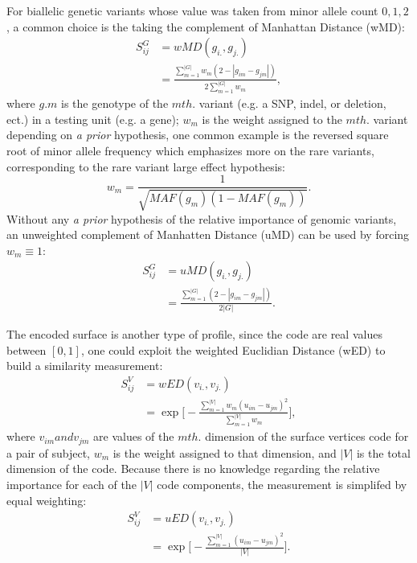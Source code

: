 \documentclass[twocolumn]{article}
\begin{document}
For biallelic genetic variants whose value was taken from minor allele count ${0, 1, 2}$, a common choice is the taking the complement of Manhattan Distance (wMD):
\begin{equation} \label{eq_wSG}
\begin{split}
  S_{ij}^G &= wMD(g_{i.},g_{j.}) \\
  &= \frac{\sum_{m=1}^{|G|}{w_m(2-|g_{im}-g_{jm}|)}} {2\sum_{m=1}^{|G|}{w_m}},
\end{split}
\end{equation}
where $g.m$ is the genotype of the $m th.$ variant (e.g. a SNP, indel, or deletion, ect.) in a testing unit (e.g. a gene); $w_m$ is the weight assigned to the $m th.$ variant depending on \textit{a prior} hypothesis, one common example is the reversed square root of minor allele frequency which emphasizes more on the rare variants, corresponding to the rare variant large effect hypothesis:
\begin{displaymath}w_m=\frac{1}{\sqrt{MAF(g_m)(1-MAF(g_m))}}.\end{displaymath}
Without any \textit{a prior} hypothesis of the relative importance of genomic variants, an unweighted complement of Manhatten Distance (uMD) can be used by forcing $w_m \equiv 1$:
\begin{equation*} \label{eq_uSG}
\begin{split}
  S_{ij}^G &= uMD(g_{i.}, g_{j.}) \\
  &= \frac{\sum_{m = 1}^{|G|}{(2-|g_{im} - g_{jm}|)}}  {2|G|}.
\end{split}
\end{equation*}

The encoded surface is another type of profile, since the code are real values between $[0,1]$, one could exploit the weighted Euclidian Distance (wED) to build a similarity measurement:
\begin{equation} \label{eq_wSV}
\begin{split}
  S_{ij}^V &= wED(v_{i.},v_{j.}) \\
  &= \exp
  {
    \Big[-\frac{\sum_{m=1}^{|V|}{w_m(u_{im}-u_{jm})^2}} {\sum_{m=1}^{|V|}{w_m}}\Big]
  },
\end{split}
\end{equation}
where $v_{im} and v_{jm}$ are values of the $m th.$ dimension of the surface vertices code for a pair of subject, $w_m$ is the weight assigned to that dimension, and $|V|$ is the total dimension of the code. Because there is no knowledge regarding the relative importance for each of the $|V|$ code components, the measurement is simplifed by equal weighting:
\begin{equation*} \label{eq_uSV}
\begin{split}
  S_{ij}^V &= uED(v_{i.},v_{j.}) \\
  &= \exp
  {
    \Big[-\frac{\sum_{m=1}^{|V|}{(u_{im}-u_{jm})^2}} {|V|}\Big]
  }.
\end{split}
\end{equation*}
\end{document}
